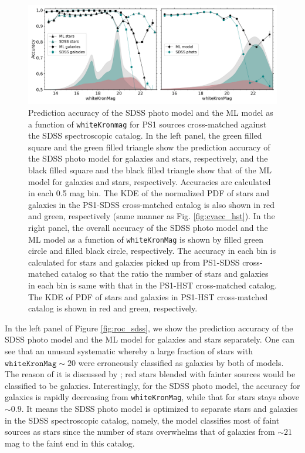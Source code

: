 \documentclass[twocolumn]{aastex62}
\begin{document}
{%
\begin{figure}[t]
 \centering
  \includegraphics[width=6.5in, bb = 0 0 900 360]{./Figures/Accuracy_SDSS_ML_model.pdf}
  \caption{
  Prediction accuracy of the SDSS photo model and the ML model 
  as a function of \texttt{whiteKronmag} for PS1 sources cross-matched against the SDSS spectroscopic catalog. 
  In the left panel, the green filled square and the green filled triangle 
  show the prediction accuracy of the SDSS photo model for galaxies and stars, respectively, 
  and the black filled square and the black filled triangle show that of the ML model for galaxies and stars, respectively. 
  Accuracies are calculated in each 0.5 mag bin. 
  The KDE of the normalized PDF of stars and galaxies 
  in the PS1-SDSS cross-matched catalog is also shown in red and green, respectively (same manner as Fig. \ref{fig:cvacc_hst}). 
  In the right panel, the overall accuracy of the SDSS photo model and the ML model 
  as a function of \texttt{whiteKronMag} is shown by filled green circle and filled black circle, respectively. 
  The accuracy in each bin is calculated for stars and galaxies picked up 
  from PS1-SDSS cross-matched catalog 
  so that the ratio the number of stars and galaxies in each bin is 
  same with that in the PS1-HST cross-matched catalog. 
  The KDE of PDF of stars and galaxies in PS1-HST cross-matched catalog is shown in red and green, respectively. 
  } 
  \label{fig:acc_sdss}
\end{figure}
In the left panel of Figure \ref{fig:roc_sdss}, we show the prediction accuracy of the SDSS photo model 
and the ML model for galaxies and stars separately. 
One can see that an unusual systematic whereby a large fraction of stars with $\mathtt{whiteKronMag} \sim 20$ 
were erroneously classified as galaxies by both of models. 
The reason of it is discussed by \cite{Miller17}; 
red stars blended with fainter sources would be classified to be galaxies. 
Interestingly, for the SDSS photo model, the accuracy for galaxies is rapidly decreasing from \texttt{whiteKronMag}, 
while that for stars stays above $\sim 0.9$. 
It means the SDSS photo model is optimized to separate stars and galaxies in the SDSS spectroscopic catalog, 
namely, the model classifies most of faint sources as stars 
since the number of stars overwhelms that of galaxies from $\sim 21$ mag to the faint end in this catalog. 

}
\end{document}
